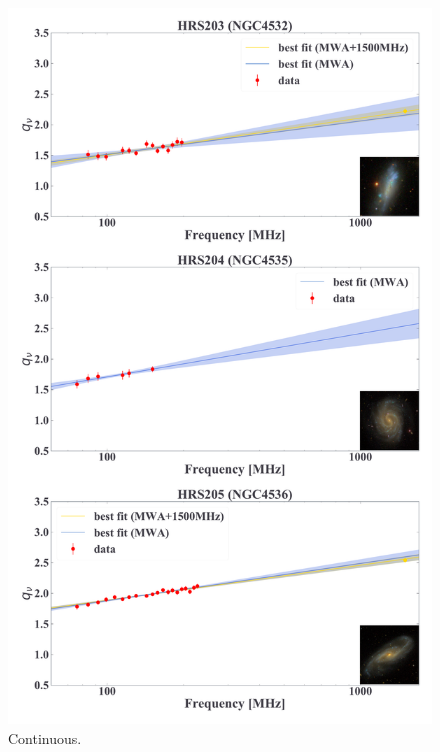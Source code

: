 \documentclass[12pt,a4paper,twoside,openright,final,titlepage]{report}
\begin{document}
\begin{figure}[htbp]
    \centering
    \includegraphics[width=.85\linewidth]{Figures/AppendixC_qfitting5.pdf}
    \caption[Fitting results for 18 samples (5)]{\label{fig:fittingresults5}
        Continuous.
    }
\end{figure}
\end{document}
